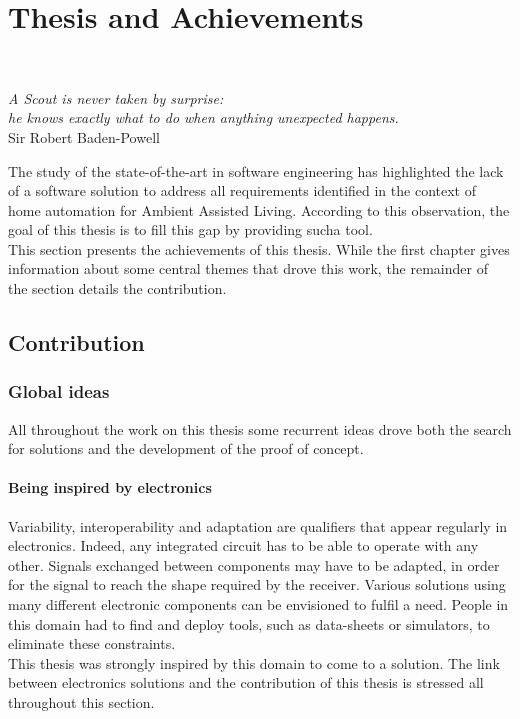 \part{Thesis and Achievements}

~\vspace{1cm}
\begin{flushright}
{\it A Scout is never taken by surprise: \\
he knows exactly what to do when anything unexpected happens.} \\ 
Sir Robert Baden-Powell
\end{flushright}
\vspace{2cm}

The study of the state-of-the-art in software engineering has highlighted the lack of a software solution to address all requirements identified in the context of home automation for Ambient Assisted Living. According to this observation, the goal of this thesis is to fill this gap by providing sucha tool.\\
This section presents the achievements of this thesis. While the first chapter gives information about some central themes that drove this work, the remainder of the section details the contribution.

\chapter{Contribution}


\section{Global ideas}

All throughout the work on this thesis some recurrent ideas drove both the search for solutions and the development of the proof of concept.

\subsection{Being inspired by electronics}

Variability, interoperability and adaptation are qualifiers that appear regularly in electronics. Indeed, any integrated circuit has to be able to operate with any other. Signals exchanged between components may have to be adapted, in order for the signal to reach the shape required by the receiver. Various solutions using many different electronic components can be envisioned to fulfil a need. People in this domain had to find and deploy tools, such as data-sheets or simulators, to eliminate these constraints.\\
This thesis was strongly inspired by this domain to come to a solution. The link between electronics solutions and the contribution of this thesis is stressed all throughout this section.

